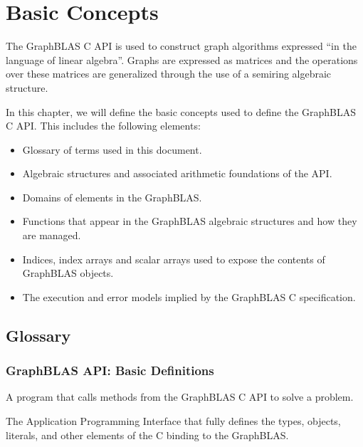 \chapter{Basic Concepts}
\label{Chp:Concepts}

The GraphBLAS C API is used to construct  
graph algorithms expressed ``in the language of linear algebra''.
Graphs are expressed as matrices and the operations over 
these matrices are generalized through the use of a
semiring algebraic structure.

In this chapter, we will define the basic concepts used to
define the GraphBLAS C API.  This includes the following elements:
\begin{itemize}
\item Glossary of terms used in this document.  

\item Algebraic structures and associated arithmetic foundations of the API.

\item Domains of  elements in the GraphBLAS.  

\item Functions that appear in the GraphBLAS algebraic 
structures and how they are managed.

\item Indices, index arrays and scalar arrays used
to expose the contents of GraphBLAS objects.  

\item The execution and error models implied by the GraphBLAS C specification.

\end{itemize}

\section{Glossary}

\subsection{GraphBLAS API: Basic Definitions}

\glossBegin

 A program that calls methods from the GraphBLAS C API to
solve a problem.

 The Application Programming Interface that fully defines the types, objects, 
literals, and other elements of the C binding to the GraphBLAS.

